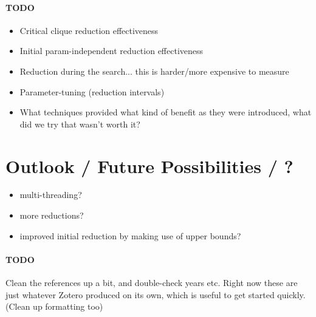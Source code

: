 \documentclass{article}
\newcommand{\todo}[1]{\paragraph{TODO} #1}
\theoremstyle{definition}
\begin{document}
\todo

\begin{itemize}
	\item Critical clique reduction effectiveness
	\item Initial param-independent reduction effectiveness
	\item Reduction during the search... this is harder/more expensive to measure
	\item Parameter-tuning (reduction intervals)
	\item What techniques provided what kind of benefit as they were introduced, what did we try
		that wasn't worth it?
\end{itemize}

\section{Outlook / Future Possibilities / ?}

\begin{itemize}
	\item multi-threading?
	\item more reductions?
	\item improved initial reduction by making use of upper bounds?
\end{itemize}

\todo Clean the references up a bit, and double-check years etc. Right now these are just whatever
Zotero produced on its own, which is useful to get started quickly. (Clean up formatting too)
\end{document}
